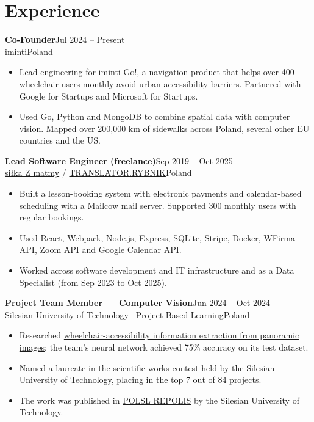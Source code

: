 \documentclass[10pt,a4paper]{article}
\newcommand{\entry}[4]{\textbf{#1}\hfill{\small #2}\\{\small #3\hfill\textcolor{muted}{#4}}\par}
\begin{document}
\section{Experience}
\entry{Co-Founder}{Jul 2024 -- Present}{\href{https://iminti.com}{iminti}}{Poland}
\begin{itemize}
\item Lead engineering for \href{https://iminti.com/pl/go}{iminti Go!}, a navigation product that helps over 400 wheelchair users monthly avoid urban accessibility barriers. Partnered with Google for Startups and Microsoft for Startups.
\item Used Go, Python and MongoDB to combine spatial data with computer vision. Mapped over 200,000 km of sidewalks across Poland, several other EU countries and the US.
\end{itemize}
\vspace{2pt}
\entry{Lead Software Engineer \textnormal{(freelance)}}{Sep 2019 -- Oct 2025}{\href{https://silkazmatmy.pl/}{siłka Z matmy} / \href{https://www.linkedin.com/company/1472703/}{TRANSLATOR.RYBNIK}}{Poland}
\begin{itemize}
\item Built a lesson-booking system with electronic payments and calendar-based scheduling with a Mailcow mail server. Supported 300 monthly users with regular bookings.
\item Used React, Webpack, Node.js, Express, SQLite, Stripe, Docker, WFirma API, Zoom API and Google Calendar API.
\item Worked across software development and IT infrastructure and as a Data Specialist (from Sep 2023 to Oct 2025).
\end{itemize}
\vspace{2pt}
\entry{Project Team Member --- Computer Vision}{Jun 2024 -- Oct 2024}{\href{https://www.linkedin.com/school/15098218/}{Silesian University of Technology} \textbar\ \href{https://www.polsl.pl/ps_aktualnosci/iii-edycja-projektu-politechnika/}{Project Based Learning}}{Poland}
\begin{itemize}
\item Researched \href{https://repolis.bg.polsl.pl/dlibra/publication/90136/edition/80108?language=pl}{wheelchair-accessibility information extraction from panoramic images}; the team's neural network achieved 75\% accuracy on its test dataset.
\item Named a laureate in the scientific works contest held by the Silesian University of Technology, placing in the top 7 out of 84 projects.
\item The work was published in \href{https://repolis.bg.polsl.pl/dlibra/publication/90136/edition/80108?language=pl}{POLSL REPOLIS} by the Silesian University of Technology.
\end{itemize}
\end{document}
